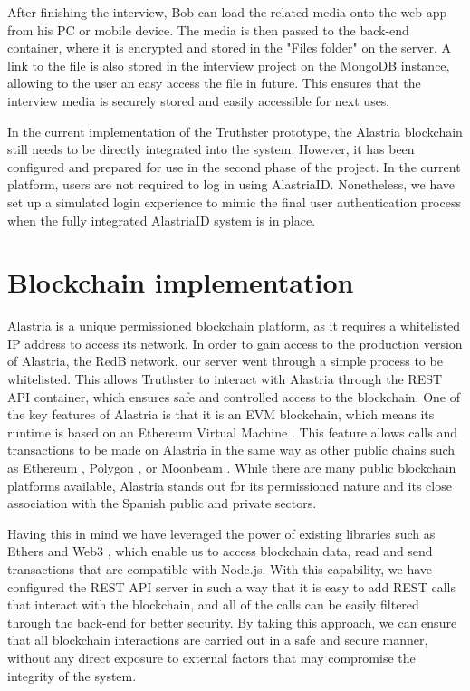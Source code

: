 \documentclass[target=mst,aauheader=]{thud}
\begin{document}
After finishing the interview, Bob can load the related media onto the web app from his PC or mobile device. The media is then passed to the back-end container, where it is encrypted and stored in the "Files folder" on the server. A link to the file is also stored in the interview project on the MongoDB instance, allowing to the user an easy access the file in future. This ensures that the interview media is securely stored and easily accessible for next uses.

In the current implementation of the Truthster prototype, the Alastria blockchain still needs to be directly integrated into the system. However, it has been configured and prepared for use in the second phase of the project. In the current platform, users are not required to log in using AlastriaID. Nonetheless, we have set up a simulated login experience to mimic the final user authentication process when the fully integrated AlastriaID system is in place.

\section{Blockchain implementation}

Alastria is a unique permissioned blockchain platform, as it requires a whitelisted IP address to access its network. In order to gain access to the production version of Alastria, the RedB network, our server went through a simple process to be whitelisted. This allows Truthster to interact with Alastria through the REST API container, which ensures safe and controlled access to the blockchain.
One of the key features of Alastria is that it is an EVM blockchain, which means its runtime is based on an Ethereum Virtual Machine \cite{evm}. This feature allows calls and transactions to be made on Alastria in the same way as other public chains such as Ethereum \cite{ethereum}, Polygon \cite{polygon}, or Moonbeam \cite{moonbeam}. While there are many public blockchain platforms available, Alastria stands out for its permissioned nature and its close association with the Spanish public and private sectors.

Having this in mind we have leveraged the power of existing libraries such as Ethers \cite{ethers} and Web3 \cite{web3}, which enable us to access blockchain data, read and send transactions that are compatible with Node.js. With this capability, we have configured the REST API server in such a way that it is easy to add REST calls that interact with the blockchain, and all of the calls can be easily filtered through the back-end for better security. By taking this approach, we can ensure that all blockchain interactions are carried out in a safe and secure manner, without any direct exposure to external factors that may compromise the integrity of the system.
\end{document}
